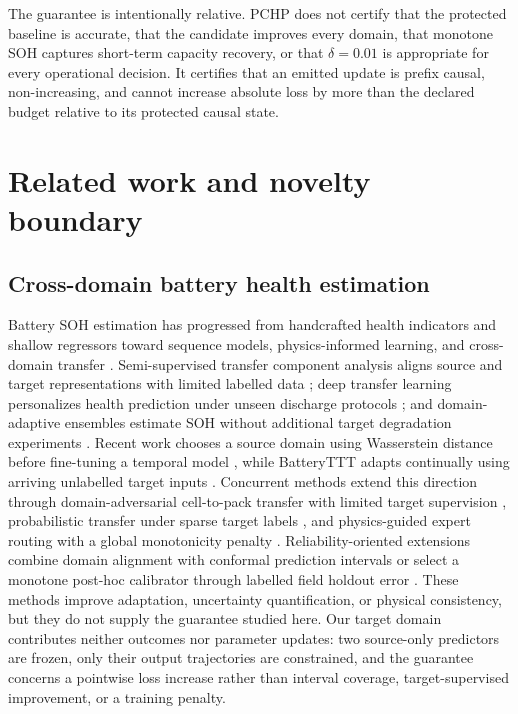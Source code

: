 \documentclass[11pt]{article}
\begin{document}
The guarantee is intentionally relative. PCHP does not certify that the protected baseline is accurate, that the candidate improves every domain, that monotone SOH captures short-term capacity recovery, or that $\delta=0.01$ is appropriate for every operational decision. It certifies that an emitted update is prefix causal, non-increasing, and cannot increase absolute loss by more than the declared budget relative to its protected causal state.

\section{Related work and novelty boundary}

\subsection{Cross-domain battery health estimation}

Battery SOH estimation has progressed from handcrafted health indicators and shallow regressors toward sequence models, physics-informed learning, and cross-domain transfer \citep{ng2020mlbattery,roman2021pipeline,wang2024pinn}. Semi-supervised transfer component analysis aligns source and target representations with limited labelled data \citep{li2020sstca}; deep transfer learning personalizes health prediction under unseen discharge protocols \citep{ma2022personalized}; and domain-adaptive ensembles estimate SOH without additional target degradation experiments \citep{lu2023without}. Recent work chooses a source domain using Wasserstein distance before fine-tuning a temporal model \citep{duan2025wasserstein}, while BatteryTTT adapts continually using arriving unlabelled target inputs \citep{feng2024batteryttt}. Concurrent methods extend this direction through domain-adversarial cell-to-pack transfer with limited target supervision \citep{shu2026celltopack}, probabilistic transfer under sparse target labels \citep{shao2026probabilistic}, and physics-guided expert routing with a global monotonicity penalty \citep{jiang2026phasemoe}. Reliability-oriented extensions combine domain alignment with conformal prediction intervals \citep{filgueira2026conformalized} or select a monotone post-hoc calibrator through labelled field holdout error \citep{nyachionjeka2026safecalibrated}. These methods improve adaptation, uncertainty quantification, or physical consistency, but they do not supply the guarantee studied here. Our target domain contributes neither outcomes nor parameter updates: two source-only predictors are frozen, only their output trajectories are constrained, and the guarantee concerns a pointwise loss increase rather than interval coverage, target-supervised improvement, or a training penalty.
\end{document}
